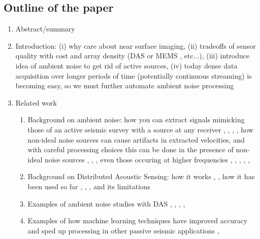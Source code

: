 \documentclass[11pt]{article}
\begin{document}
\subsection*{Outline of the paper}
	\begin{enumerate}
	\vspace{-0.2cm}
	\item Abstract/summary
	\vspace{-0.3cm}
	\item Introduction: (i) why care about near surface imaging, (ii) tradeoffs of sensor quality with cost and array density (DAS or MEMS \cite{Evans2014}, etc...), (iii) introduce idea of ambient noise to get rid of active sources, (iv) today dense data acquisition over longer periods of time (potentially continuous streaming) is becoming easy, so we must further automate ambient noise processing 
	\vspace{-0.8cm}
	\item Related work
		\begin{enumerate}
		\vspace{-0.3cm}
		\item Background on ambient noise: how you can extract signals mimicking those of an active seismic survey with a source at any receiver \cite{Lobkis2001}, \cite{Lin2008}, \cite{Wapenaar2010A}, \cite{Wapenaar2010B}, how non-ideal noise sources can cause artifacts in extracted velocities, and with careful processing choices this can be done in the presence of non-ideal noise sources \cite{Bensen2007}, \cite{Daskalakis2016}, \cite{Zhan2013}, even those occuring at higher frequencies \cite{Girard2016}, \cite{Martin2015}, \cite{Martin2016}, \cite{Nakata2011}, \cite{Nakata2015}, \cite{Zeng2017}
		\vspace{-0.1cm}
		\item Background on Distributed Acoustic Sensing: how it works \cite{Posey2000}, \cite{Bakku2015}, how it has been used so far \cite{Daley2013}, \cite{Webster2013}, \cite{Mateeva2014}, and its limitations \cite{Kuvshinov2016}
		\vspace{-0.1cm}
		\item Examples of ambient noise studies with DAS \cite{AjoFranklin2015}, \cite{Martin2015}, \cite{Martin2016}, \cite{Martin2017}, \cite{Zeng2017}
		\vspace{-0.1cm}
		\item Examples of how machine learning techniques have improved accuracy and sped up processing in other passive seismic applications \cite{Fisher2016}, \cite{Yoon2015}
		\end{enumerate}

\end{enumerate}
\end{document}
